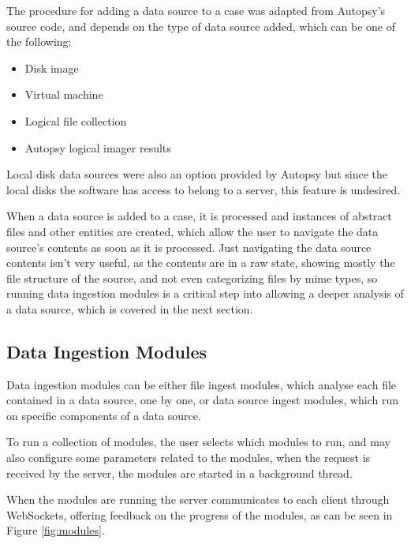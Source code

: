 The procedure for adding a data source to a case was adapted from Autopsy's source code, and depends on the type of data source added, which can be one of the following:
\begin{itemize}
 \item Disk image
 \item Virtual machine
 \item Logical file collection
 \item Autopsy logical imager results
\end{itemize}

Local disk data sources were also an option provided by Autopsy but since the local disks the software has access to belong to a server, this feature is undesired.

When a data source is added to a case, it is processed and instances of abstract files and other entities are created, which allow the user to navigate the data source's contents as soon as it is processed.
Just navigating the data source contents isn't very useful, as the contents are in a raw state, showing mostly the file structure of the source, and not even categorizing files by mime types, so running data
ingestion modules is a critical step into allowing a deeper analysis of a data source, which is covered in the next section.

\subsection{Data Ingestion Modules}

Data ingestion modules can be either file ingest modules, which analyse each file contained in a data source, one by one,
or data source ingest modules, which run on specific components of a data source.

To run a collection of modules, the user selects which modules to run, and may also configure some parameters related to the modules, when the request is received by the server, the modules are started in a background thread.

When the modules are running the server communicates to each client through WebSockets, offering feedback on the progress of the modules, as can be seen in Figure \ref{fig:modules}.

